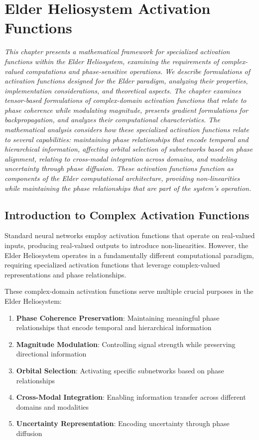 \chapter{Elder Heliosystem Activation Functions}

\textit{This chapter presents a mathematical framework for specialized activation functions within the Elder Heliosystem, examining the requirements of complex-valued computations and phase-sensitive operations. We describe formulations of activation functions designed for the Elder paradigm, analyzing their properties, implementation considerations, and theoretical aspects. The chapter examines tensor-based formulations of complex-domain activation functions that relate to phase coherence while modulating magnitude, presents gradient formulations for backpropagation, and analyzes their computational characteristics. The mathematical analysis considers how these specialized activation functions relate to several capabilities: maintaining phase relationships that encode temporal and hierarchical information, affecting orbital selection of subnetworks based on phase alignment, relating to cross-modal integration across domains, and modeling uncertainty through phase diffusion. These activation functions function as components of the Elder computational architecture, providing non-linearities while maintaining the phase relationships that are part of the system's operation.}

\section{Introduction to Complex Activation Functions}

Standard neural networks employ activation functions that operate on real-valued inputs, producing real-valued outputs to introduce non-linearities. However, the Elder Heliosystem operates in a fundamentally different computational paradigm, requiring specialized activation functions that leverage complex-valued representations and phase relationships.

These complex-domain activation functions serve multiple crucial purposes in the Elder Heliosystem:

\begin{enumerate}
    \item \textbf{Phase Coherence Preservation}: Maintaining meaningful phase relationships that encode temporal and hierarchical information
    \item \textbf{Magnitude Modulation}: Controlling signal strength while preserving directional information
    \item \textbf{Orbital Selection}: Activating specific subnetworks based on phase relationships
    \item \textbf{Cross-Modal Integration}: Enabling information transfer across different domains and modalities
    \item \textbf{Uncertainty Representation}: Encoding uncertainty through phase diffusion
\end{enumerate}


